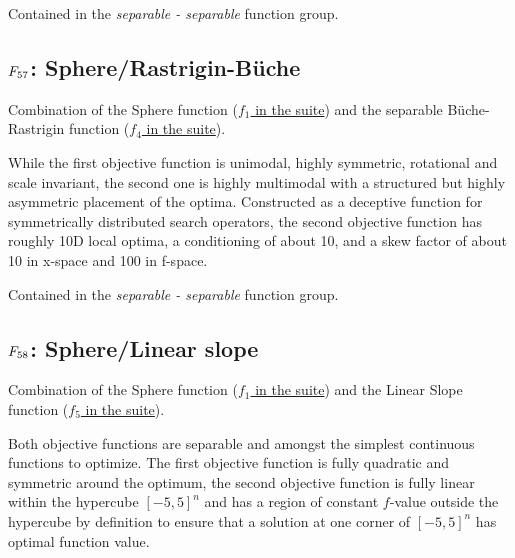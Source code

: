 Contained in the \emph{separable - separable} function group.



\subsection[\texorpdfstring{\protect\(F_{57}\protect\): Sphere/Rastrigin-B\"{u}che}{F57: Sphere/Rastrigin-B\"{u}che}]{\texorpdfstring{\protect\(F_{57}\protect\): Sphere/Rastrigin-B\"{u}che}{}}
\label{index:f57}\label{index:sphere-rastrigin-buche}
Combination of the Sphere function (\href{https://coco.gforge.inria.fr/downloads/download16.00/bbobdocfunctions.pdf\#page=5}{\(f_1\) in the \bbob suite}) and the
separable B\"{u}che-Rastrigin function (\href{https://coco.gforge.inria.fr/downloads/download16.00/bbobdocfunctions.pdf\#page=20}{\(f_4\) in the \bbob suite}).

While the first objective function is unimodal, highly symmetric,
rotational and scale invariant, the second one is highly multimodal
with a structured but highly asymmetric placement of the optima.
Constructed as a deceptive function for symmetrically distributed search
operators, the second objective function has roughly 10D
local optima, a conditioning of about 10, and a skew factor of about
10 in x-space and 100 in f-space.

Contained in the \emph{separable - separable} function group.



\subsection[\texorpdfstring{\protect\(F_{58}\protect\): Sphere/Linear slope}{F58: Sphere/Linear slope}]{\texorpdfstring{\protect\(F_{58}\protect\): Sphere/Linear slope}{}}
\label{index:sphere-linear-slope}\label{index:f58}
Combination of the Sphere function (\href{https://coco.gforge.inria.fr/downloads/download16.00/bbobdocfunctions.pdf\#page=5}{\(f_1\) in the \bbob suite}) and the
Linear Slope function (\href{https://coco.gforge.inria.fr/downloads/download16.00/bbobdocfunctions.pdf\#page=25}{\(f_5\) in the \bbob suite}).

Both objective functions are separable and amongst the simplest
continuous functions to optimize. The first objective function is fully
quadratic and symmetric around the optimum, the second objective function
is fully linear within the hypercube \([-5,5]^n\) and has a region of
constant \(f\)-value outside the hypercube by definition to ensure
that a solution at one corner of \([-5,5]^n\) has optimal function value.

